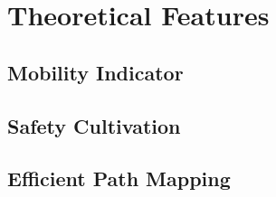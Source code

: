 \section{Theoretical Features}
\subsection{Mobility Indicator}
\subsection{Safety Cultivation}
\subsection{Efficient Path Mapping}


